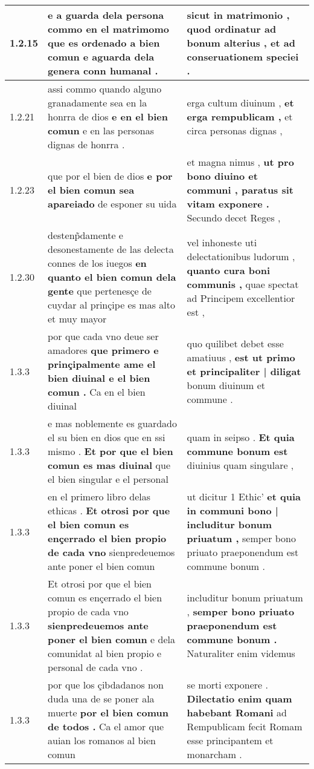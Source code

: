 \begin{tabular}{|p{1cm}|p{6.5cm}|p{6.5cm}|}
1.2.15 & e a guarda dela persona commo en el matrimomo \textbf{ que es ordenado a bien comun } e aguarda dela genera conn humanal . & sicut in matrimonio , \textbf{ quod ordinatur ad bonum alterius , } et ad conseruationem speciei . \\\hline
1.2.21 & assi commo quando alguno granadamente sea en la honrra de dios \textbf{ e en el bien comun } e en las personas dignas de honrra . & erga cultum diuinum , \textbf{ et erga rempublicam , } et circa personas dignas , \\\hline
1.2.23 & que por el bien de dios \textbf{ e por el bien comun sea apareiado } de esponer su uida & et magna nimus , \textbf{ ut pro bono diuino et communi , paratus sit vitam exponere . } Secundo decet Reges , \\\hline
1.2.30 & destenp̃damente e desonestamente de las delecta connes de los iuegos \textbf{ en quanto el bien comun dela gente } que pertenesçe de cuydar al prinçipe es mas alto et muy mayor & vel inhoneste uti delectationibus ludorum , \textbf{ quanto cura boni communis , } quae spectat ad Principem excellentior est , \\\hline
1.3.3 & por que cada vno deue ser amadores \textbf{ que primero e prinçipalmente ame el bien diuinal e el bien comun . } Ca en el bien diuinal & quo quilibet debet esse amatiuus , \textbf{ est ut primo et principaliter | diligat } bonum diuinum et commune . \\\hline
1.3.3 & e mas noblemente es guardado el su bien en dios que en ssi mismo . \textbf{ Et por que el bien comun es mas diuinal } que el bien singular e el personal & quam in seipso . \textbf{ Et quia commune bonum est } diuinius quam singulare , \\\hline
1.3.3 & en el primero libro delas ethicas . \textbf{ Et otrosi por que el bien comun es ençerrado el bien propio de cada vno } sienpredeuemos ante poner el bien comun & ut dicitur 1 Ethic’ \textbf{ et quia in communi bono | includitur bonum priuatum , } semper bono priuato praeponendum est commune bonum . \\\hline
1.3.3 & Et otrosi por que el bien comun es ençerrado el bien propio de cada vno \textbf{ sienpredeuemos ante poner el bien comun } e dela comunidat al bien propio e personal de cada vno . & includitur bonum priuatum , \textbf{ semper bono priuato praeponendum est commune bonum . } Naturaliter enim videmus \\\hline
1.3.3 & por que los çibdadanos non duda una de se poner ala muerte \textbf{ por el bien comun de todos . } Ca el amor que auian los romanos al bien comun & se morti exponere . \textbf{ Dilectatio enim quam habebant Romani } ad Rempublicam fecit Romam esse principantem et monarcham . \\\hline

\end{tabular}
